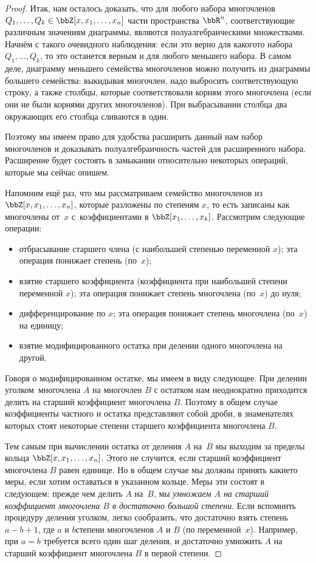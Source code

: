 \begin{proof}
Итак, нам осталось доказать, что для любого набора
многочленов $Q_1,\dots,Q_k\hm\in\bbZ[x,x_1,\dots,x_n]$ части
пространства $\bbR^n$, соответствующие различным значениям
диаграммы, являются полуалгебраическими множествами.
Начнём с такого очевидного наблюдения: если это верно для
какого\д то набора $Q_1,\dots,Q_k$, то это останется верным
и для любого меньшего набора. В самом деле, диаграмму
меньшего семейства многочленов можно получить из диаграммы
большего семейства: выкидывая многочлен, надо выбросить
соответствующую строку, а также столбцы, которые соответствовали
корням этого многочлена (если они не были корнями других
многочленов). При выбрасывании столбца два окружающих его
столбца сливаются в один.

Поэтому мы имеем право для удобства расширить данный нам набор
многочленов и доказывать полуалгебраичность частей для
расширенного набора. Расширение будет состоять в замыкании
относительно некоторых операций, которые мы сейчас опишем.

Напомним ещё раз, что мы рассматриваем семейство многочленов
из $\bbZ[x,x_1,\dots,x_n]$, которые разложены по степеням $x$,
то есть записаны как многочлены от~$x$ с~коэффициентами в
$\bbZ[x_1,\dots,x_k]$. Рассмотрим следующие операции:
\begin{itemize}
        \item
отбрасывание старшего члена (с наибольшей степенью переменной
$x$); эта операция понижает степень (по~$x$);
        \item
взятие старшего коэффициента (коэффициента при наибольшей
степени переменной $x$); эта операция понижает степень многочлена (по~$x$)
до нуля;
        \item
дифференцирование по $x$; эта операция понижает степень многочлена (по~$x$)
на единицу;
        \item
взятие модифицированного остатка при делении одного
многочлена на другой.
\end{itemize}
Говоря о  модифицированном остатке,%
мы имеем в виду
следующее. При делении  уголком\
многочлена $A$ на многочлен $B$ с
остатком нам неоднократно приходится делить на старший
коэффициент многочлена $B$. Поэтому в общем случае коэффициенты
частного и остатка представляют собой дроби, в знаменателях
которых стоят некоторые степени старшего коэффициента многочлена
$B$.

Тем самым при вычислении остатка от деления $A$ на~$B$ мы
выходим за пределы кольца $\bbZ[x,x_1,\dots,x_n]$. Этого не
случится, если старший коэффициент многочлена $B$ равен единице.
Но в общем случае мы должны принять какие\д то меры, если хотим
оставаться в указанном кольце. Меры эти состоят в следующем:
прежде чем делить $A$ на~$B$, мы \textsl{умножаем $A$ на старший
коэффициент многочлена $B$ в достаточно большой степени}. Если
вспомнить процедуру деления уголком, легко сообразить, что
достаточно взять степень $a-b+1$, где $a$ и $b$\т степени
многочленов $A$ и $B$ (по переменной~$x$).
Например, при $a=b$ требуется всего один
шаг деления, и достаточно умножить $A$ на старший коэффициент
многочлена $B$ в первой степени.


\end{proof}
